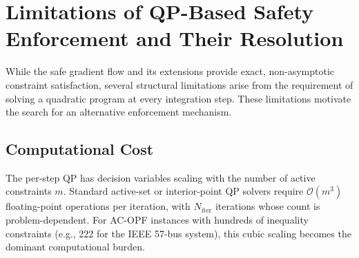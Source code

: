 \documentclass[11pt,onecolumn]{article}
\theoremstyle{definition}
\theoremstyle{remark}
\begin{document}

\section{Limitations of QP-Based Safety Enforcement and Their Resolution}\label{sec:qpcomparison}

While the safe gradient flow and its extensions provide exact, non-asymptotic constraint satisfaction, several structural limitations arise from the requirement of solving a quadratic program at every integration step. These limitations motivate the search for an alternative enforcement mechanism.

\subsection{Computational Cost}

The per-step QP has decision variables scaling with the number of active constraints $m$. Standard active-set or interior-point QP solvers require $\mathcal{O}(m^3)$ floating-point operations per iteration, with $N_{\text{iter}}$ iterations whose count is problem-dependent. For AC-OPF instances with hundreds of inequality constraints (e.g., 222 for the IEEE 57-bus system), this cubic scaling becomes the dominant computational burden.
\end{document}
